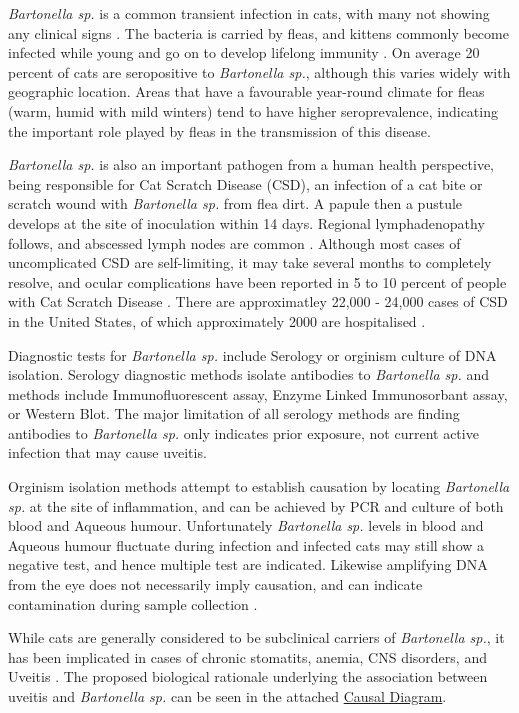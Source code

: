 \documentclass[11pt,twocolumn]{article}
\begin{document}
		\emph{Bartonella sp.} is a common transient infection in cats, with many not showing any clinical signs \cite{Guptill2010}. 
		The bacteria is carried by fleas, and kittens commonly become infected while young and go on to develop lifelong immunity \cite{Brunt2006}.
		On average 20 percent of cats are seropositive to \emph{Bartonella sp.}, although this varies widely with geographic location\cite{Jameson1995a}. Areas that have a favourable year-round climate for fleas (warm, humid with mild winters) tend to have higher seroprevalence, indicating the important role played by fleas in the transmission of this disease.


		\emph{Bartonella sp.} is also an important pathogen from a human health perspective, being responsible for Cat Scratch Disease (CSD), an infection of a cat bite or scratch wound with \emph{Bartonella sp.} from flea dirt. 
		A papule then a pustule develops at the site of inoculation within 14 days. Regional lymphadenopathy follows, and abscessed lymph nodes are common \cite{Brunt2006}. 
		Although most cases of uncomplicated CSD are self-limiting, it may take several months to completely resolve, and ocular complications have been reported in 5 to 10 percent of people with Cat Scratch Disease \cite{Wade2000}.
		There are approximatley 22,000 - 24,000 cases of CSD in the United States, of which approximately 2000 are hospitalised \cite{Jackson1993}.
	
		Diagnostic tests for \emph{Bartonella sp.} include Serology or orginism culture of DNA isolation.
		Serology diagnostic methods isolate antibodies to \emph{Bartonella sp.} and methods include Immunofluorescent assay, Enzyme Linked Immunosorbant assay, or Western Blot. 
		The major limitation of all serology methods are finding antibodies to \emph{Bartonella sp.} only indicates prior exposure, not current active infection that may cause uveitis.


		Orginism isolation methods attempt to establish causation by locating \emph{Bartonella sp.} at the site of inflammation, and can be achieved by PCR and culture of both blood and Aqueous humour. 
		Unfortunately \emph{Bartonella sp.} levels in blood and Aqueous humour fluctuate during infection and infected cats may still show a negative test, and hence multiple test are indicated\cite{Guptill2010}. 
		Likewise amplifying DNA from the eye does not necessarily imply causation, and can indicate contamination during sample collection \cite{Powell2010}.
		

		While cats are generally considered to be subclinical carriers of \emph{Bartonella sp.}, it has been implicated in cases of chronic stomatits, anemia, CNS disorders, and Uveitis \cite{Nasir2005}.
		The proposed biological rationale underlying the association between uveitis and \emph{Bartonella sp.} can be seen in the attached \hyperref[fig:1]{Causal Diagram}.
\end{document}
